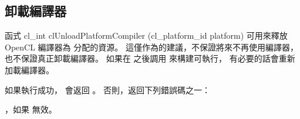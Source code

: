 \subsection{卸載編譯器}

函式
\startCLFUNC
cl_int clUnloadPlatformCompiler (cl_platform_id platform)
\stopCLFUNC
可用來釋放 OpenCL 編譯器為  分配的資源。
這僅作為的建議，不保證將來不再使用編譯器，也不保證真正卸載編譯器。
如果在  之後調用
  來構建可執行，
有必要的話會重新加載編譯器。

如果執行成功，  會返回 。
否則，返回下列錯誤碼之一：
\startigBase
\item {}，如果  無效。
\stopigBase

